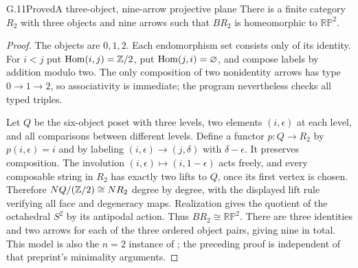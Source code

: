 \begin{claim}{G.11}{Proved}{A three-object, nine-arrow projective plane}
There is a finite category $R_2$ with three objects and nine arrows such that $BR_2$ is homeomorphic to $\mathbb{RP}^2$.
\end{claim}
\begin{proof}
The objects are $0,1,2$. Each endomorphism set consists only of its identity. For $i<j$ put $\operatorname{Hom}(i,j)=\mathbb Z/2$, put $\operatorname{Hom}(j,i)=\varnothing$, and compose labels by addition modulo two. The only composition of two nonidentity arrows has type $0\to1\to2$, so associativity is immediate; the program nevertheless checks all typed triples.

Let $Q$ be the six-object poset with three levels, two elements $(i,\epsilon)$ at each level, and all comparisons between different levels. Define a functor $p:Q\to R_2$ by $p(i,\epsilon)=i$ and by labeling $(i,\epsilon)\to(j,\delta)$ with $\delta-\epsilon$. It preserves composition. The involution $(i,\epsilon)\mapsto(i,1-\epsilon)$ acts freely, and every composable string in $R_2$ has exactly two lifts to $Q$, once its first vertex is chosen. Therefore $NQ/(\mathbb Z/2)\cong NR_2$ degree by degree, with the displayed lift rule verifying all face and degeneracy maps. Realization gives the quotient of the octahedral $S^2$ by its antipodal action. Thus $BR_2\cong\mathbb{RP}^2$. There are three identities and two arrows for each of the three ordered object pairs, giving nine in total. This model is also the $n=2$ instance of \citet[Theorem 6.2]{CarcaciaCampos2026}; the preceding proof is independent of that preprint's minimality arguments.
\end{proof}


